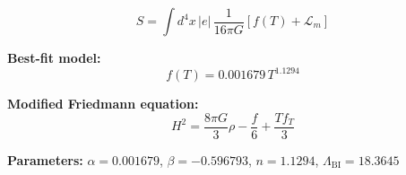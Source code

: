 
\begin{equation}
  S = \int d^4x \, |e| \, \frac{1}{16\pi G} \left[ f(T) + \mathcal{L}_m \right]
\end{equation}

\textbf{Best-fit model:}
\begin{equation}
  f(T) = 0.001679 \, T^{1.1294}
\end{equation}

\textbf{Modified Friedmann equation:}
\begin{equation}
  H^2 = \frac{8\pi G}{3} \rho - \frac{f}{6} + \frac{T f_T}{3}
\end{equation}

\textbf{Parameters:}
$\alpha = 0.001679$, \quad
$\beta = -0.596793$, \quad
$n = 1.1294$, \quad
$\Lambda_{\text{BI}} = 18.3645$